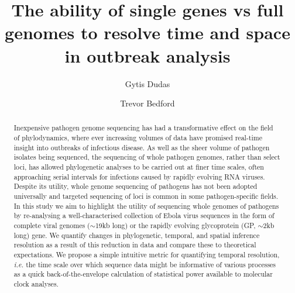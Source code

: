 \documentclass[11pt,oneside,letterpaper]{article}
\title{\vspace{1.0cm} \LARGE \bf The ability of single genes vs full genomes to resolve time and space in outbreak analysis}
\author[1,2$\ast$]{Gytis Dudas}
\author[1]{Trevor Bedford}
\affil[1]{Vaccine and Infectious Disease Division, Fred Hutchinson Cancer Research Center, Seattle, WA, USA}
\affil[2]{Gothenburg Global Biodiversity Center, Gothenburg, Sweden}
\affil[$\ast$]{Corresponding author (gytisdudas@gmail.com)}
\def\tbc#1{\textcolor{purple}{[#1]}}
\begin{document}
\maketitle

\begin{abstract}
Inexpensive pathogen genome sequencing has had a transformative effect on the field of phylodynamics, where ever increasing volumes of data have promised real-time insight into outbreaks of infectious disease.
As well as the sheer volume of pathogen isolates being sequenced, the sequencing of whole pathogen genomes, rather than select loci, has allowed phylogenetic analyses to be carried out at finer time scales, often approaching serial intervals for infections caused by rapidly evolving RNA viruses.
Despite its utility, whole genome sequencing of pathogens has not been adopted universally and targeted sequencing of loci is common in some pathogen-specific fields.
In this study we aim to highlight the utility of sequencing whole genomes of pathogens by re-analysing a well-characterised collection of Ebola virus sequences in the form of complete viral genomes ($\sim$19kb long) or the rapidly evolving glycoprotein (GP, $\sim$2kb long) gene.
We quantify changes in phylogenetic, temporal, and spatial inference resolution as a result of this reduction in data and compare these to theoretical expectations.
We propose a simple intuitive metric for quantifying temporal resolution, \textit{i.e.} the time scale over which sequence data might be informative of various processes as a quick back-of-the-envelope calculation of statistical power available to molecular clock analyses.

\end{abstract}
\end{document}
